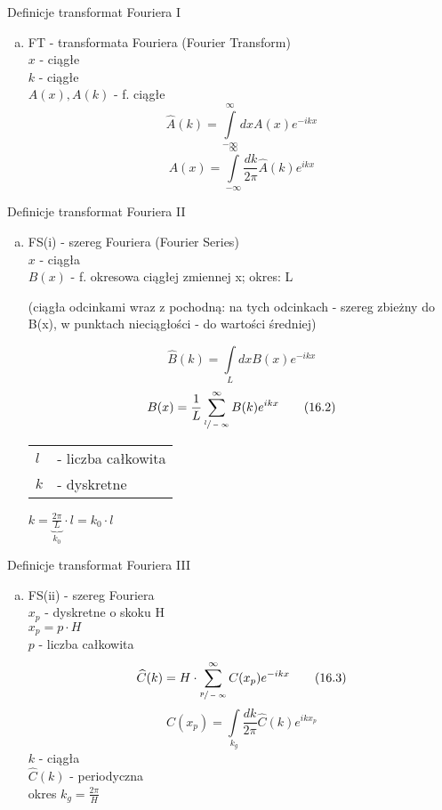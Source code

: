 \begin{frame}{Definicje transformat Fouriera I}
	\begin{enumerate}[a)]
		\item FT - transformata Fouriera (Fourier Transform) \\
		$x$ - ciągłe \\
		$k$ - ciągłe \\
		$A(x), A(k)$ - f. ciągłe
		\[
			\widehat{A}(k) = \int\limits_{-\infty}^{\infty}dx A(x) e^{-ikx}
			\tag{16.1}
		\]
		\[
			A(x) = \int\limits_{-\infty}^{\infty} \frac{dk}{2 \pi} \widehat{A}(k) e^{ikx}
			\tag{16.1}
		\]
	\end{enumerate}
\end{frame}
\begin{frame}{Definicje transformat Fouriera II}
	\begin{enumerate}[b)]
		\item FS(i) - szereg Fouriera (Fourier Series) \\
		$x$ - ciągła \\
		$B(x)$ - f. okresowa ciągłej zmiennej x; okres: L
		\begin{center}
			(ciągła odcinkami wraz z pochodną: na tych odcinkach - szereg zbieżny do B(x), w punktach nieciągłości - do wartości średniej)
		\end{center}
		\[
			\widehat{B}(k) = \int\limits_{L}dx B(x) e^{-ikx}
			\tag{16.2}
		\]
		\[
			B(x) = \frac{1}{L}\sum_{\sfrac{l}{-\infty}}^{\infty} B(k) e^{ikx}
			\tag{16.2}
		\]
		\begin{tabular}{ll}
			$l$ & - liczba całkowita \\
			$k$ & - dyskretne
		\end{tabular}
		\hfill $k = \underbrace{\frac{2 \pi}{L}}_{k_0} \cdot l = k_0 \cdot l$
	\end{enumerate}
\end{frame}
\begin{frame}{Definicje transformat Fouriera III}
	\begin{enumerate}[c)]
		\item FS(ii) - szereg Fouriera \\
		$x_p$ - dyskretne o skoku H \\
		$x_p = p \cdot H$ \\
		$p$ - liczba całkowita
		\[
			\widehat{C}(k) = H \cdot \sum_{\sfrac{p}{-\infty}}^{\infty} C(x_p) e^{-ikx}
			\tag{16.3}
		\]
		\[
			C(x_p) = \int\limits_{k_g} \frac{dk}{2 \pi} \widehat{C}(k) e^{ikx_p}
			\tag{16.3}
		\]
		$k$ - ciągła \\
		$\widehat{C}(k)$ - periodyczna \\
		okres $k_g = \frac{2 \pi}{H}$
	\end{enumerate}
\end{frame}
